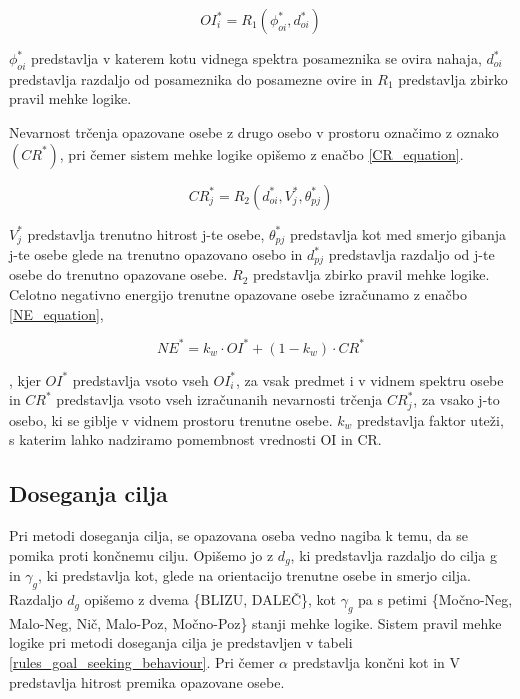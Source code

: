 \documentclass[9pt]{pnas-new}
\begin{document}
\begin{equation}
\label{OI_equation}
OI_{i}^* = R_{1}(\phi^*_{oi}, d^*_{oi})
\end{equation}

${\phi^*_{oi}}$ predstavlja v katerem kotu vidnega spektra posameznika se ovira nahaja, ${d^*_{oi}}$ predstavlja razdaljo od posameznika do posamezne ovire in ${R_{1}}$ predstavlja zbirko pravil mehke logike.


Nevarnost trčenja opazovane osebe z drugo osebo v prostoru označimo z oznako ${(CR^*)}$, pri čemer sistem mehke logike opišemo z enačbo \ref{CR_equation}.

\begin{equation}
\label{CR_equation}
CR_{j}^* = R_{2}(d^*_{oi}, V_{j}^*, \theta_{pj}^*)
\end{equation}

${V_{j}^*}$ predstavlja trenutno hitrost j-te osebe, ${\theta_{pj}^*}$ predstavlja kot med smerjo gibanja j-te osebe glede na trenutno opazovano osebo in ${d^*_{pj}}$ predstavlja razdaljo od j-te osebe do trenutno opazovane osebe. ${R_{2}}$ predstavlja zbirko pravil mehke logike. Celotno negativno energijo trenutne opazovane osebe izračunamo z enačbo \ref{NE_equation},

\begin{equation}
\label{NE_equation}
NE^* = k_{w} \cdot OI^* + (1 - k_{w}) \cdot CR^*
\end{equation}

, kjer ${OI^*}$ predstavlja vsoto vseh ${OI_{i}^*}$, za vsak predmet i v vidnem spektru osebe in ${CR^*}$ predstavlja vsoto vseh izračunanih nevarnosti trčenja ${CR_{j}^*}$, za vsako j-to osebo, ki se giblje v vidnem prostoru trenutne osebe. ${k_{w}}$ predstavlja faktor uteži, s katerim lahko nadziramo pomembnost vrednosti OI in CR.


\subsection*{Doseganja cilja}
\label{doseganje_cilja}
Pri metodi doseganja cilja, se opazovana oseba vedno nagiba k temu, da se pomika proti končnemu cilju. Opišemo jo z ${d_g}$, ki predstavlja razdaljo do cilja g in ${\gamma_{g}}$, ki predstavlja kot, glede na orientacijo trenutne osebe in smerjo cilja. Razdaljo ${d_g}$ opišemo z dvema \{BLIZU, DALEČ\}, kot ${\gamma_{g}}$ pa s petimi \{Močno-Neg, Malo-Neg, Nič, Malo-Poz, Močno-Poz\} stanji mehke logike. Sistem pravil mehke logike pri metodi doseganja cilja je predstavljen v tabeli \ref{rules_goal_seeking_behaviour}. Pri čemer ${\alpha}$ predstavlja končni kot in V predstavlja hitrost premika opazovane osebe.
\end{document}
